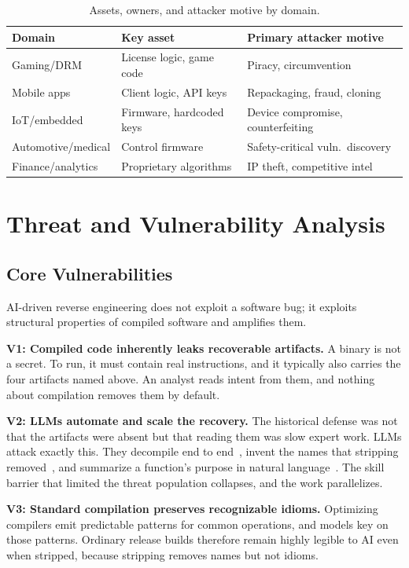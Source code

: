 \documentclass[conference]{IEEEtran}
\begin{document}
\begin{table}[t]
\caption{Assets, owners, and attacker motive by domain.}
\label{tab:assets}
\centering\footnotesize
\begin{tabular}{@{}p{1.7cm}p{2.0cm}p{3.2cm}@{}}
\toprule
\textbf{Domain} & \textbf{Key asset} & \textbf{Primary attacker motive} \\
\midrule
Gaming/DRM & License logic, game code & Piracy, circumvention \\
Mobile apps & Client logic, API keys & Repackaging, fraud, cloning \\
IoT/embedded & Firmware, hardcoded keys & Device compromise, counterfeiting \\
Automotive/medical & Control firmware & Safety-critical vuln.\ discovery \\
Finance/analytics & Proprietary algorithms & IP theft, competitive intel \\
\bottomrule
\end{tabular}
\end{table}

\section{Threat and Vulnerability Analysis}
\subsection{Core Vulnerabilities}
AI-driven reverse engineering does not exploit a software bug; it exploits
structural properties of compiled software and amplifies them.

\textbf{V1: Compiled code inherently leaks recoverable artifacts.} A binary is not a
secret. To run, it must contain real instructions, and it typically also carries the
four artifacts named above. An analyst reads intent from them, and nothing about
compilation removes them by default.

\textbf{V2: LLMs automate and scale the recovery.} The historical defense was not
that the artifacts were absent but that reading them was slow expert work. LLMs
attack exactly this. They decompile end to end~\cite{llm4decompile}, invent the
names that stripping removed~\cite{gennm,funcname,resym}, and summarize a function's
purpose in natural language~\cite{howfar}. The skill barrier that limited the threat
population collapses, and the work parallelizes.

\textbf{V3: Standard compilation preserves recognizable idioms.} Optimizing
compilers emit predictable patterns for common operations, and models key on those
patterns. Ordinary release builds therefore remain highly legible to AI even when
stripped, because stripping removes names but not idioms.
\end{document}
